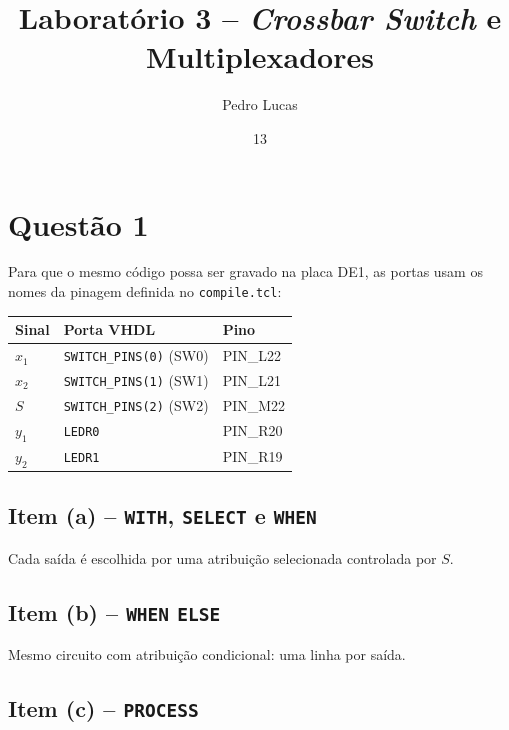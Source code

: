\documentclass[report, 12pt]{uftreport}
\title{Laboratório 3 -- \textit{Crossbar Switch} e Multiplexadores}
\author{Pedro Lucas}{Moreira}
\date{13}{10}{2026}
\begin{document}
\frontmatter
\maketitle
\makefrontpage

\mainmatter
{}

\chapter{Questão 1}

Para que o mesmo código possa ser gravado na placa DE1, as portas usam os nomes da pinagem definida no \texttt{compile.tcl}:

\begin{center}
\begin{tabular}{lll}
\toprule
Sinal & Porta VHDL & Pino \\
\midrule
$x_1$ & \texttt{SWITCH\_PINS(0)} (SW0) & PIN\_L22 \\
$x_2$ & \texttt{SWITCH\_PINS(1)} (SW1) & PIN\_L21 \\
$S$   & \texttt{SWITCH\_PINS(2)} (SW2) & PIN\_M22 \\
$y_1$ & \texttt{LEDR0} & PIN\_R20 \\
$y_2$ & \texttt{LEDR1} & PIN\_R19 \\
\bottomrule
\end{tabular}
\end{center}

\section{Item (a) -- \texttt{WITH}, \texttt{SELECT} e \texttt{WHEN}}

Cada saída é escolhida por uma atribuição selecionada controlada por $S$.



\section{Item (b) -- \texttt{WHEN} \texttt{ELSE}}

Mesmo circuito com atribuição condicional: uma linha por saída.



\section{Item (c) -- \texttt{PROCESS}}
\end{document}
